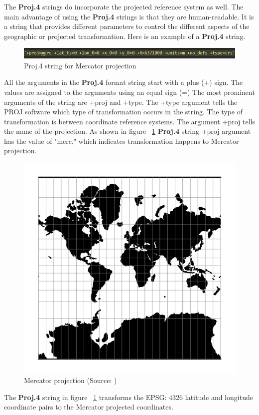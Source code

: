 The \textbf{Proj.4} strings do incorporate the projected reference system as well. The main advantage of using the \textbf{Proj.4} strings is that they are human-readable. It is a string that provides different parameters to control the different aspects of the geographic or projected transformation.
Here is an example of a \textbf{Proj.4} string.

\begin{figure}[h]
    \centering
    \includegraphics[width=1.0\linewidth]{figures/chapter-7/proj_string_mercator.png}
    \caption{Proj.4 string for Mercator projection}
    \label{fig:proj-string-mercator}
\end{figure}

All the arguments in the \textbf{Proj.4} format string start with a plus (+) sign. The values are assigned to the arguments using an equal sign (=) The most prominent arguments of the string are +proj and +type. The +type argument tells the PROJ software which type of transformation occurs in the string.
The type of transformation is between coordinate reference systems. The argument +proj tells the name of the projection. As shown in figure ~\ref{fig:proj-string-mercator} \textbf{Proj.4}  string +proj argument has the value of "merc," which indicates transformation happens to  Mercator projection.
\begin{figure}[h]
    \centering
    \includegraphics[width=0.5\linewidth]{figures/chapter-7/merc.png}
    \caption{Mercator projection (Source: \cite{PROJ_SITE})}
    \label{fig:mercator-projection}
\end{figure}

The \textbf{Proj.4} string in figure ~\ref{fig:proj-string-mercator} transforms the EPSG: 4326 latitude and longitude coordinate pairs to the Mercator projected coordinates.

